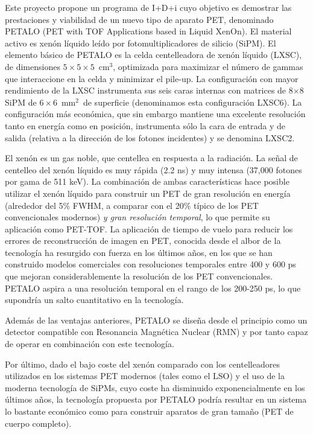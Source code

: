Este proyecto propone un programa de I+D+i cuyo objetivo es demostrar las prestaciones y viabilidad de un nuevo tipo de aparato PET, denominado PETALO (PET with TOF Applications based in Liquid XenOn). El material activo es xenón líquido leído por fotomultiplicadores de silicio (SiPM). El elemento básico de PETALO es la celda centelleadora de xenón líquido (LXSC), de dimensiones $5\times 5 \times 5$~cm$^3$, optimizada para maximizar el número de gammas que interaccione en la celda y minimizar el pile-up. La configuración con mayor rendimiento de la LXSC instrumenta sus seis caras internas con matrices de 8$\times$8 SiPM de $6 \times 6$~mm$^2$~de superficie (denominamos esta configuración LXSC6). La configuración más económica, que sin embargo mantiene una excelente resolución tanto en energía como en posición, instrumenta sólo la cara de entrada y de salida (relativa a la dirección de los fotones incidentes) y se denomina LXSC2.

El xenón es un gas noble, que centellea en respuesta a la radiación. La señal de centelleo del xenón líquido es muy rápida (2.2 ns) y muy intensa (37,000 fotones por gama de 511 keV). La combinación de ambas características hace posible utilizar el xenón líquido para construir un PET de gran resolución en energía (alrededor del 5\% FWHM, a comparar con el 20\% típico de los PET convencionales modernos) {\em y gran resolución temporal}, lo que permite su aplicación como PET-TOF. La aplicación de tiempo de vuelo para reducir los errores de reconstrucción de imagen en PET, conocida desde el albor de la tecnología ha resurgido con fuerza en los últimos años, en los que se han construido modelos comerciales con resoluciones temporales entre 400 y 600 ps que mejoran considerablemente la resolución de los PET convencionales. PETALO aspira a una resolución temporal en el rango de los 200-250 ps, lo que supondría un salto cuantitativo en la tecnología.

Además de las ventajas anteriores, PETALO se diseña desde el principio como un detector compatible con Resonancia Magnética Nuclear (RMN) y por tanto capaz de operar en combinación con este tecnología.

Por último, dado el bajo coste del xenón comparado con los centelleadores utilizados en los sistemas PET modernos (tales como el LSO) y el uso de la moderna tecnología de SiPMs, cuyo coste ha disminuido exponencialmente en los últimos años, la tecnología propuesta por PETALO podría resultar en un sistema lo bastante económico como para construir aparatos de gran tamaño (PET de cuerpo completo). 

